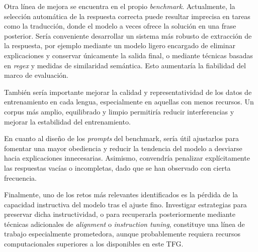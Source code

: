 Otra línea de mejora se encuentra en el propio \textit{benchmark}. Actualmente, la selección automática de la respuesta correcta puede resultar imprecisa en tareas como la traducción, donde el modelo a veces ofrece la solución en una frase posterior. Sería conveniente desarrollar un sistema más robusto de extracción de la respuesta, por ejemplo mediante un modelo ligero encargado de eliminar explicaciones y conservar únicamente la salida final, o mediante técnicas basadas en \textit{regex} y medidas de similaridad semántica. Esto aumentaría la fiabilidad del marco de evaluación.

También sería importante mejorar la calidad y representatividad de los datos de entrenamiento en cada lengua, especialmente en aquellas con menos recursos. Un corpus más amplio, equilibrado y limpio permitiría reducir interferencias y mejorar la estabilidad del entrenamiento.

En cuanto al diseño de los \textit{prompts} del benchmark, sería útil ajustarlos para fomentar una mayor obediencia y reducir la tendencia del modelo a desviarse hacia explicaciones innecesarias. Asimismo, convendría penalizar explícitamente las respuestas vacías o incompletas, dado que se han observado con cierta frecuencia.

Finalmente, uno de los retos más relevantes identificados es la pérdida de la capacidad instructiva del modelo tras el ajuste fino. Investigar estrategias para preservar dicha instructividad, o para recuperarla posteriormente mediante técnicas adicionales de \textit{alignment} o \textit{instruction tuning}, constituye una línea de trabajo especialmente prometedora, aunque probablemente requiera recursos computacionales superiores a los disponibles en este TFG.




